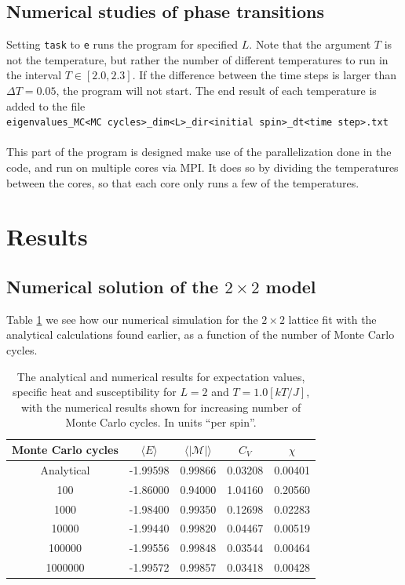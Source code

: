 \documentclass{article}
\begin{document}
\subsection{Numerical studies of phase transitions}
Setting \texttt{task} to \texttt{e} runs the program for specified $L$. Note that the argument $T$ is not the temperature, but rather the number of different temperatures to run in the interval $T \in [2.0,2.3]$. If the difference between the time steps is larger than $\Delta T = 0.05$, the program will not start. The end result of each temperature is added to the file\\
\texttt{eigenvalues\_MC<MC cycles>\_dim<L>\_dir<initial spin>\_dt<time step>.txt}\\\\
This part of the program is designed make use of the parallelization done in the code, and run on multiple cores via MPI. It does so by dividing the temperatures between the cores, so that each core only runs a few of the temperatures.

\section{Results}

\subsection{Numerical solution of the $2\times2$ model}
Table \ref{tab:meow} we see how our numerical simulation for the $2\times2$ lattice fit with the analytical calculations found earlier, as a function of the number of Monte Carlo cycles.
\begin{table}[H]
\centering
\caption{The analytical and numerical results for expectation values, specific heat and susceptibility for $L=2$ and $T= 1.0 [kT/J]$, with the numerical results shown for increasing number of Monte Carlo cycles. In units ``per spin''.}
\label{tab:meow}
\begin{tabular}{c|c|c|c|c}
  Monte Carlo cycles&$\langle E\rangle$&$\langle|\mathcal{M}|\rangle$&$C_V$&$\chi$\\\hline
  Analytical &-1.99598 &0.99866 &0.03208 &0.00401\\%
100 &-1.86000 &0.94000 &1.04160 &0.20560\\%
1000 &-1.98400 &0.99350 &0.12698 &0.02283\\%
10000 &-1.99440 &0.99820 &0.04467 &0.00519\\%
100000 &-1.99556 &0.99848 &0.03544 &0.00464\\%
1000000 &-1.99572 &0.99857 &0.03418 &0.00428
\end{tabular}
\end{table}
\end{document}
